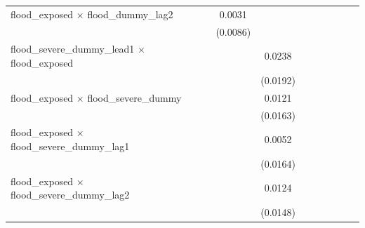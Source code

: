 \begin{tabular}{lcccccccc}
   flood\_exposed $\times$ flood\_dummy\_lag2                         & 0.0031                &                       &                       &                       &                       &                       &                       &   \\   
                                                                      & (0.0086)              &                       &                       &                       &                       &                       &                       &   \\   
   flood\_severe\_dummy\_lead1 $\times$ flood\_exposed                &                       & 0.0238                &                       &                       &                       &                       &                       &   \\   
                                                                      &                       & (0.0192)              &                       &                       &                       &                       &                       &   \\   
   flood\_exposed $\times$ flood\_severe\_dummy                       &                       & 0.0121                &                       &                       &                       &                       &                       &   \\   
                                                                      &                       & (0.0163)              &                       &                       &                       &                       &                       &   \\   
   flood\_exposed $\times$ flood\_severe\_dummy\_lag1                 &                       & 0.0052                &                       &                       &                       &                       &                       &   \\   
                                                                      &                       & (0.0164)              &                       &                       &                       &                       &                       &   \\   
   flood\_exposed $\times$ flood\_severe\_dummy\_lag2                 &                       & 0.0124                &                       &                       &                       &                       &                       &   \\   
                                                                      &                       & (0.0148)              &                       &                       &                       &                       &                       &   \\   

\end{tabular}
